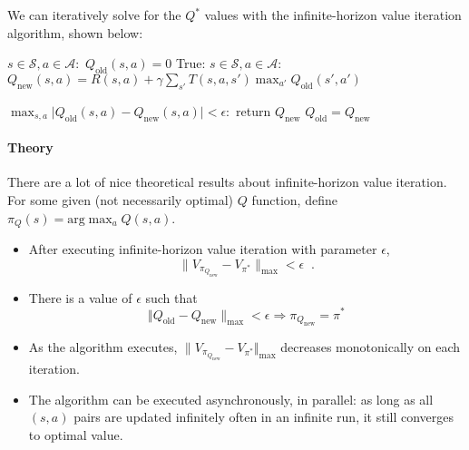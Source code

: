 We can iteratively solve for the $Q^*$ values with the infinite-horizon
value iteration algorithm, shown below:

\begin{codebox}
  \li     \For $s \in \mathcal{S}, a \in \mathcal{A}:$
	\Do
  \li        $Q_{\text{old}}(s, a) = 0$
        \End
  \li     \While True:
        \Do
  \li        \For $s \in \mathcal{S}, a \in \mathcal{A}:$
           \Do
  \li           $Q_{\text{new}}(s, a) = R(s, a) + \gamma\sum_{s'}T(s, a, s')\max_{a'}Q_{\text{old}}(s', a')$
         \End

  \li      \If $\max_{s, a}\lvert Q_{\text{old}}(s, a) - Q_{\text{new}}(s, a)\rvert < \epsilon:$
         \Do
  \li           return $Q_{\text{new}}$
        \End
  \li      $Q_{\text{old}} = Q_{\text{new}}$
	\End
\end{codebox}

\paragraph*{Theory}

There are a lot of nice theoretical results about infinite-horizon value iteration.
For some given (not necessarily optimal) $Q$ function, define
$\pi_{Q}(s) = \text{arg}\max_{a}Q(s, a)$.   
\begin{itemize}
\item After executing infinite-horizon value
iteration with parameter $\epsilon$,  
\begin{equation}
\lVert  V_{\pi_{Q_{\text{new}}}} - V_{\pi^*} \rVert_{\text{max}} < \epsilon \;\; .
\end{equation}
%
\item
There is a value of $\epsilon$ such that
\begin{equation}
 \Vert Q_{\text{old}} - Q_{\text{new}} \rVert_{\text{max}} <
\epsilon \Longrightarrow \pi_{Q_{\text{new}}} = \pi^* 
\end{equation}  
\item  As the algorithm executes,   
$\lVert V_{\pi_{Q_{\text{new}}}} - V_{\pi^*} \Vert_{\text{max}}$ decreases
monotonically on each iteration.
\item The algorithm  can be executed asynchronously, in parallel: as
  long as all $(s, a)$ pairs are updated infinitely often in an
  infinite run, it still converges to optimal value. 

\end{itemize}

